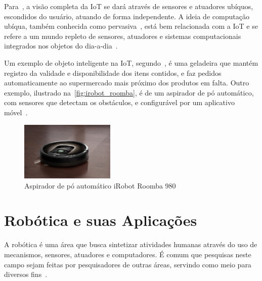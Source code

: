 Para~, a visão completa da IoT se dará através de sensores e atuadores ubíquos, escondidos do usuário, atuando de forma independente. A ideia de computação ubíqua, também conhecida como pervasiva~\cite{satyanarayanan:2001pervasive}, está bem relacionada com a IoT e se refere a um mundo repleto de sensores, atuadores e sistemas computacionais integrados nos objetos do dia-a-dia~\cite{gubbi:2013iot}.

Um exemplo de objeto inteligente na IoT, segundo~, é uma geladeira que mantém registro da validade e disponibilidade dos itens contidos, e faz pedidos automaticamente ao supermercado mais próximo dos produtos em falta. Outro exemplo, ilustrado na~\autoref{fig:irobot_roomba}, é de um aspirador de pó automático, com sensores que detectam os obstáculos, e configurável por um aplicativo móvel~\cite{irobot:roomba980}.

\begin{figure}[ht]
	\caption{\label{fig:irobot_roomba}Aspirador de pó automático iRobot Roomba 980}
	\begin{center}
	    \includegraphics[width=0.4\textwidth]{resources/irobot_roomba}
	\end{center}
\end{figure}

\section{Robótica e suas Aplicações}%
\label{sec:robotica}

A robótica é uma área que busca sintetizar atividades humanas através do uso de mecanismos, sensores, atuadores e computadores. É comum que pesquisas neste campo sejam feitas por pesquisadores de outras áreas, servindo como meio para diversos fins~\cite{craig:2005}.

